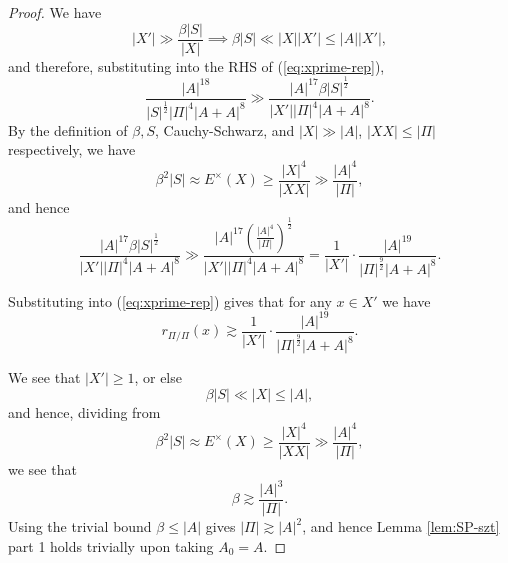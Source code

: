 \documentclass[reqno]{amsart}
\numberwithin{equation}{section}
\begin{document}
\begin{proof}
We have
\[
    \left\lvert X' \right\rvert \gg \frac{\beta \left\lvert S \right\rvert }{\left\lvert X \right\rvert }  \implies \beta \left\lvert S \right\rvert \ll \left\lvert X \right\rvert \left\lvert X' \right\rvert \leq \left\lvert A \right\rvert \left\lvert X' \right\rvert 
,\]
and therefore, substituting into the RHS of (\ref{eq:xprime-rep}),
\[
    \frac{\left\lvert A \right\rvert ^{18}}{\left\lvert S \right\rvert ^{\frac{1}{2} } \left\lvert \Pi \right\rvert ^{4} \left\lvert A + A \right\rvert ^{8}} \gg \frac{\left\lvert A \right\rvert ^{17} \beta \left\lvert S \right\rvert ^{\frac{1}{2} }}{\left\lvert X' \right\rvert \left\lvert \Pi \right\rvert ^{4} \left\lvert A + A \right\rvert ^{8}}
.\]
By the definition of \(\beta , S\), Cauchy-Schwarz, and \(\left\lvert X \right\rvert \gg \left\lvert A \right\rvert \), \(\left\lvert X X \right\rvert \leq \left\lvert \Pi \right\rvert \) respectively, we have
\[
    \beta ^{2} \left\lvert S \right\rvert \approx E^{\times }(X) \geq \frac{\left\lvert X \right\rvert ^{4}}{\left\lvert XX \right\rvert }  \gg \frac{\left\lvert A \right\rvert ^{4}}{\left\lvert \Pi \right\rvert } 
,\]
and hence
\[
    \frac{\left\lvert A \right\rvert ^{17} \beta \left\lvert S \right\rvert ^{\frac{1}{2} }}{\left\lvert X' \right\rvert \left\lvert \Pi \right\rvert ^{4} \left\lvert A + A \right\rvert ^{8}} \gg \frac{\left\lvert A \right\rvert ^{17} \left( \frac{\left\lvert A \right\rvert ^{4}}{\left\lvert \Pi \right\rvert }  \right) ^{\frac{1}{2} }}{\left\lvert X' \right\rvert \left\lvert \Pi \right\rvert ^{4} \left\lvert A + A \right\rvert ^{8}} = \frac{1}{\left\lvert X' \right\rvert } \cdot \frac{\left\lvert A \right\rvert ^{19}}{\left\lvert \Pi \right\rvert ^{\frac{9}{2} }\left\lvert A+A \right\rvert ^{8}}  
.\]

Substituting into (\ref{eq:xprime-rep}) gives that for any \(x \in X'\) we have
\begin{equation} \label{eq:xprime-rep-final}
    r_{ \Pi / \Pi } \left( x  \right)  \gtrsim \frac{1}{\left\lvert X' \right\rvert } \cdot \frac{\left\lvert A \right\rvert ^{19}}{\left\lvert \Pi \right\rvert ^{\frac{9}{2} } \left\lvert A + A \right\rvert ^{8}} .
\end{equation}

We see that \(\left\lvert X' \right\rvert \geq 1\), or else
\[
    \beta \left\lvert S \right\rvert \ll \left\lvert X \right\rvert \leq \left\lvert A \right\rvert 
,\]
and hence, dividing from
\[
    \beta^{2} \left\lvert S \right\rvert \approx E^{\times }(X) \geq \frac{\left\lvert X \right\rvert ^{4}}{\left\lvert XX \right\rvert } \gg \frac{\left\lvert A \right\rvert ^{4}}{\left\lvert \Pi \right\rvert } 
,\]
we see that
\[
    \beta \gtrsim \frac{\left\lvert A \right\rvert ^{3} }{\left\lvert \Pi \right\rvert } 
.\]
Using the trivial bound \(\beta \leq \left\lvert A \right\rvert \) gives
\(\left\lvert \Pi \right\rvert \gtrsim \left\lvert A \right\rvert ^{2}\), and hence Lemma \ref{lem:SP-szt} part 1 holds trivially
upon taking \(A_0 = A\).


\end{proof}
\end{document}
